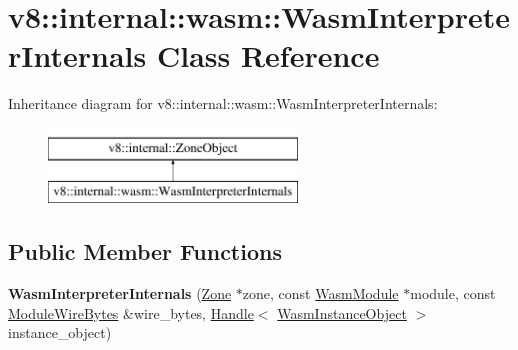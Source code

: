 \hypertarget{classv8_1_1internal_1_1wasm_1_1WasmInterpreterInternals}{}\section{v8\+:\+:internal\+:\+:wasm\+:\+:Wasm\+Interpreter\+Internals Class Reference}
\label{classv8_1_1internal_1_1wasm_1_1WasmInterpreterInternals}
Inheritance diagram for v8\+:\+:internal\+:\+:wasm\+:\+:Wasm\+Interpreter\+Internals\+:\begin{figure}[H]
\begin{center}
\leavevmode
\includegraphics[height=2.000000cm]{classv8_1_1internal_1_1wasm_1_1WasmInterpreterInternals}
\end{center}
\end{figure}
\subsection*{Public Member Functions}
\begin{DoxyCompactItemize}
\item 
\mbox{\label{classv8_1_1internal_1_1wasm_1_1WasmInterpreterInternals_ae7cef9ac3502fb65389734360db041ce}} 
{\bfseries Wasm\+Interpreter\+Internals} (\mbox{\hyperlink{classv8_1_1internal_1_1Zone}{Zone}} $\ast$zone, const \mbox{\hyperlink{structv8_1_1internal_1_1wasm_1_1WasmModule}{Wasm\+Module}} $\ast$module, const \mbox{\hyperlink{structv8_1_1internal_1_1wasm_1_1ModuleWireBytes}{Module\+Wire\+Bytes}} \&wire\+\_\+bytes, \mbox{\hyperlink{classv8_1_1internal_1_1Handle}{Handle}}$<$ \mbox{\hyperlink{classv8_1_1internal_1_1WasmInstanceObject}{Wasm\+Instance\+Object}} $>$ instance\+\_\+object)
\end{DoxyCompactItemize}

